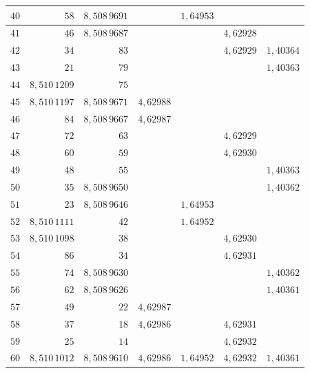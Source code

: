 \begin{center}
\begin{tabular}{r||r|r|r|r|r|r}
\(40\) & \(58\) & \(8{,}508\,9691\) &  & \(1{,}64953\) &  &  \\
\hline
\(41\) & \(46\) & \(8{,}508\,9687\) &  &  & \(4{,}62928\) &  \\
\(42\) & \(34\) & \(83\) &  &  & \(4{,}62929\) & \(1{,}40364\) \\
\(43\) & \(21\) & \(79\) &  &  &  & \(1{,}40363\) \\
\(44\) & \(8{,}510\,1209\) & \(75\) &  &  &  &  \\
\(45\) & \(8{,}510\,1197\) & \(8{,}508\,9671\) & \(4{,}62988\) &  &  &  \\
\hline
\(46\) & \(84\) & \(8{,}508\,9667\) & \(4{,}62987\) &  &  &  \\
\(47\) & \(72\) & \(63\) &  &  & \(4{,}62929\) &  \\
\(48\) & \(60\) & \(59\) &  &  & \(4{,}62930\) &  \\
\(49\) & \(48\) & \(55\) &  &  &  & \(1{,}40363\) \\
\(50\) & \(35\) & \(8{,}508\,9650\) &  &  &  & \(1{,}40362\) \\
\hline
\(51\) & \(23\) & \(8{,}508\,9646\) &  & \(1{,}64953\) &  &  \\
\(52\) & \(8{,}510\,1111\) & \(42\) &  & \(1{,}64952\) &  &  \\
\(53\) & \(8{,}510\,1098\) & \(38\) &  &  & \(4{,}62930\) &  \\
\(54\) & \(86\) & \(34\) &  &  & \(4{,}62931\) &  \\
\(55\) & \(74\) & \(8{,}508\,9630\) &  &  &  & \(1{,}40362\) \\
\hline
\(56\) & \(62\) & \(8{,}508\,9626\) &  &  &  & \(1{,}40361\) \\
\(57\) & \(49\) & \(22\) & \(4{,}62987\) &  &  &  \\
\(58\) & \(37\) & \(18\) & \(4{,}62986\) &  & \(4{,}62931\) &  \\
\(59\) & \(25\) & \(14\) &  &  & \(4{,}62932\) &  \\
\(60\) & \(8{,}510\,1012\) & \(8{,}508\,9610\) & \(4{,}62986\) & \(1{,}64952\) & \(4{,}62932\) & \(1{,}40361\) \\
\end{tabular}
\endgroup
\end{center}


